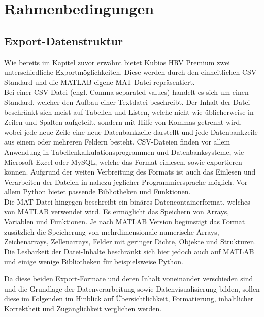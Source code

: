 
\chapter{Rahmenbedingungen}


\section{Export-Datenstruktur}

Wie bereits im Kapitel zuvor erwähnt bietet Kubios HRV Premium zwei unterschiedliche Exportmöglichkeiten. Diese werden durch den einheitlichen CSV-Standard und die MATLAB-eigene MAT-Datei repräsentiert.\\
Bei einer CSV-Datei (engl. Comma-separated values) handelt es sich um einen Standard, welcher den Aufbau einer Textdatei beschreibt. Der Inhalt der Datei beschränkt sich meist auf Tabellen und Listen, welche nicht wie üblicherweise in Zeilen und Spalten aufgeteilt, sondern mit Hilfe von Kommas getrennt wird, wobei jede neue Zeile eine neue Datenbankzeile darstellt und jede Datenbankzeile aus einem oder mehreren Feldern besteht. CSV-Dateien finden vor allem Anwendung in Tabellenkalkulationsprogrammen und Datenbanksysteme, wie Microsoft Excel oder MySQL, welche das Format einlesen, sowie exportieren können. Aufgrund der weiten Verbreitung des Formats ist auch das Einlesen und Verarbeiten der Dateien in nahezu jeglicher Programmiersprache möglich. Vor allem Python bietet passende Bibliotheken und Funktionen.\cite{csv}\\
Die MAT-Datei hingegen beschreibt ein binäres Datencontainerformat, welches von MATLAB verwendet wird. Es ermöglicht das Speichern von Arrays, Variablen und Funktionen. Je nach MATLAB Version begünstigt das Format zusätzlich die Speicherung von mehrdimensionale numerische Arrays, Zeichenarrays, Zellenarrays, Felder mit geringer Dichte, Objekte und Strukturen. Die Lesbarkeit der Datei-Inhalte beschränkt sich hier jedoch auch auf MATLAB und einige wenige Bibliotheken für beispielsweise Python.\cite{mat}

Da diese beiden Export-Formate und deren Inhalt voneinander verschieden sind und die Grundlage der Datenverarbeitung sowie Datenvisualisierung bilden, sollen diese im Folgenden im Hinblick auf Übersichtlichkeit, Formatierung, inhaltlicher Korrektheit und Zugänglichkeit verglichen werden.

